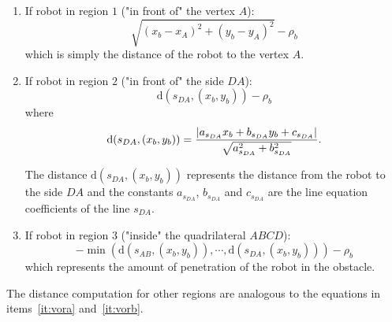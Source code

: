 \begin{enumerate}
\begin{enumerate}
	   	\item \label{it:vora} If robot in region $1$ ("in front of" the vertex $A$):
   	   	\begin{equation*}
    	    \sqrt{(x_{b} - x_{A})^2 + (y_{b} - y_{A})^2} - \rho_b
	    \end{equation*}
	    which is simply the distance of the robot to the vertex $A$.
	    
	    \item \label{it:vorb} If robot in region $2$ ("in front of" the side $DA$):	    
		\begin{equation*}
			\mathrm{d}(s_{DA}, (x_{b}, y_{b})) - \rho_b
		\end{equation*}
		where
   	   	\begin{equation*}
    	    \mathrm{d}(s_{DA}, (x_{b}, y_{b})) =\\ \frac{|a_{s_{DA}}x_{b} + b_{s_{DA}}y_{b}
    	    + c_{s_{DA}}|}{\sqrt{a_{s_{DA}}^2 + b_{s_{DA}}^2}}.
	    \end{equation*}
	    
	    The distance $\mathrm{d}(s_{DA}, (x_{b}, y_{b}))$ represents the distance
	    from the robot to the side $DA$ and the constants $a_{s_{DA}}$, $b_{s_{DA}}$ and $c_{s_{DA}}$ are the line equation coefficients of the line $s_{DA}$.
	    
	    \item If robot in region $3$ ("inside" the quadrilateral $ABCD$):
   	   	\begin{equation*}
    	    -\min\left(\mathrm{d}(s_{AB}, (x_{b}, y_{b})), \cdots, \mathrm{d}(s_{DA}, (x_{b}, y_{b}))\right) - \rho_b
	    \end{equation*}
	    which represents the amount of penetration of the robot in the obstacle.
	    
    \end{enumerate}
    
    The distance computation for other regions are analogous to the equations in items~\ref{it:vora} and~\ref{it:vorb}.
    
    \begin{figure}[!h]
	\centering
	{
	    }
\end{figure}
\end{enumerate}
